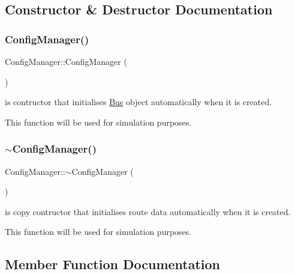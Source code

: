 \subsection{Constructor \& Destructor Documentation}
\mbox{\label{classConfigManager_a7d3d7c10423d969f7544509f6fcca32f}} 
\subsubsection{\texorpdfstring{Config\+Manager()}{ConfigManager()}}
{\footnotesize\ttfamily Config\+Manager\+::\+Config\+Manager (\begin{DoxyParamCaption}{ }\end{DoxyParamCaption})}



is contructor that initialises \hyperlink{classBus}{Bus} object automatically when it is created. 

This function will be used for simulation purposes. \mbox{\label{classConfigManager_a7fa65fdff98bdd5bbbf72196bd9ccf17}} 
\subsubsection{\texorpdfstring{$\sim$\+Config\+Manager()}{~ConfigManager()}}
{\footnotesize\ttfamily Config\+Manager\+::$\sim$\+Config\+Manager (\begin{DoxyParamCaption}{ }\end{DoxyParamCaption})}



is copy contructor that initialises route data automatically when it is created. 

This function will be used for simulation purposes. 

\subsection{Member Function Documentation}
\mbox{\label{classConfigManager_a0db6329b7dd5ac1f92ee262c30df4ef9}} 
